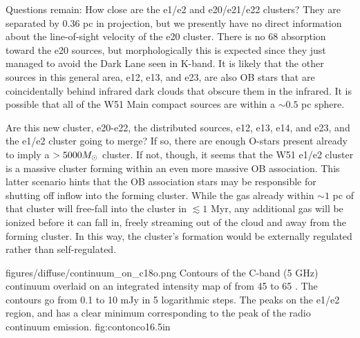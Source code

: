 Questions remain: %
How close are the e1/e2 and e20/e21/e22 clusters?  They are
separated by 0.36 pc in projection, but we presently have no direct information
about the line-of-sight velocity of the e20 cluster.  There is no 68 \kms
\formaldehyde absorption toward the e20 sources, but morphologically this is
expected since they just managed to avoid the Dark Lane seen in K-band.  It is
likely that the other sources in this general area, e12, e13, and e23, are also
OB stars that are coincidentally behind infrared dark clouds that obscure them
in the infrared.  It is possible that all of the W51 Main compact sources are
within a $\sim 0.5$ pc sphere.

Are this new cluster, e20-e22, the distributed sources, e12, e13, e14, and e23,
and the e1/e2 cluster going to merge?  If so, there are enough O-stars present
already to imply a $>5000 M_{\odot}$ cluster.  If not, though, it seems that the
W51 e1/e2 cluster is a massive cluster forming within an even more massive OB
association.  This latter scenario hints that the OB association stars may be
responsible for shutting off inflow into the forming cluster.  While the gas
already within $\sim 1$ pc of that cluster will free-fall into the cluster in
$\lesssim 1$ Myr, any additional gas will be ionized before it can fall in,
freely streaming out of the cloud and away from the forming cluster.  In this
way, the cluster's formation would be externally regulated rather than
self-regulated.


\Figure
{figures/diffuse/continuum_on_c18o.png}
{Contours of the C-band (5 GHz) continuum overlaid on an integrated intensity
map of \ceighteeno from 45 to 65 \kms \citep{Parsons2012a}.  The contours
go from 0.1 to 10 mJy in 5 logarithmic steps.  The \ceighteeno peaks on the
e1/e2 region, and has a clear minimum corresponding to the peak of the radio
continuum emission.
}
{fig:contonco}{1}{6.5in}


